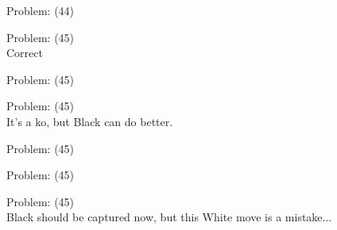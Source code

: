 \documentclass[11pt]{article}
\begin{document}
\begin{minipage}[t]{0.5\textwidth}
  {\centering
  
  Problem: (44)\\
  
  }
\end{minipage}
\begin{minipage}[t]{0.5\textwidth}
  {\centering
  
  Problem: (45)\\
  Correct\\
  }
\end{minipage}
\begin{minipage}[t]{0.5\textwidth}
  {\centering
  
  Problem: (45)\\
  
  }
\end{minipage}
\begin{minipage}[t]{0.5\textwidth}
  {\centering
  
  Problem: (45)\\
  It's a ko, but Black can do better.\\
  }
\end{minipage}
\begin{minipage}[t]{0.5\textwidth}
  {\centering
  
  Problem: (45)\\
  
  }
\end{minipage}
\begin{minipage}[t]{0.5\textwidth}
  {\centering
  
  Problem: (45)\\
  
  }
\end{minipage}
\begin{minipage}[t]{0.5\textwidth}
  {\centering
  
  Problem: (45)\\
  Black should be captured now, but this White move is a mistake...\\
  }
\end{minipage}
\end{document}
